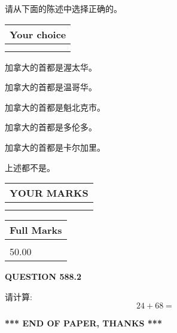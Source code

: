 \documentclass{ctexart}
\begin{document}
  
请从下面的陈述中选择正确的。
  
  
\noindent\hspace{3.0in} \begin{tabular}{|l|}
\hline
Your choice \\
\hline
 \\ 
 \\ 
\hline
\end{tabular}
  
  
 
 
加拿大的首都是渥太华。
 
 
加拿大的首都是温哥华。
 
 
加拿大的首都是魁北克市。
 
 
加拿大的首都是多伦多。
 
 
加拿大的首都是卡尔加里。
 
 
 上述都不是。
 
 
  
\vspace{0.2in}
  
\noindent\begin{tabular}{|l|}
\hline
 YOUR MARKS  \\
\hline
 \\ 
 \\ 
\hline
\end{tabular}
\hspace{0.05in} \begin{tabular}{|l|}
\hline
 Full Marks  \\
\hline
 \\ 
50.00 \\
\hline
\end{tabular}
{\textbf{\Large{QUESTION
588.2 
}}}
  
  
 
请计算:
\begin{equation}
24 +  %
68 = \nonumber
\end{equation}
 

 

 
   
   
 \vspace{0.2in}
 
   
   
   
   
\vspace{1.0in} 
{\textbf{\large{ *** END OF PAPER, THANKS *** }}} 
   
\end{document}
